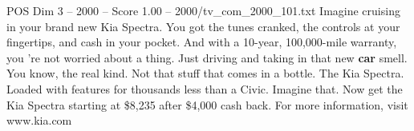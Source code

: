 \begin{textsample}{POS Dim 3 – 2000 – Score 1.00 – 2000/tv\_com\_2000\_101.txt}  \label{ex:f3_pos_086}
Imagine cruising in your brand new Kia Spectra.
You got the tunes cranked, the controls at your fingertips, and cash in your pocket.
And with a 10-year, 100,000-mile warranty, you 're not worried about a thing.
Just driving and taking in that new \textbf{car} smell.
You know, the real kind.
Not that stuff that comes in a bottle.
The Kia Spectra.
Loaded with features for thousands less than a Civic.
Imagine that.
Now get the Kia Spectra starting at \$8,235 after \$4,000 cash back.
For more information, visit www.kia.com

\end{textsample}
